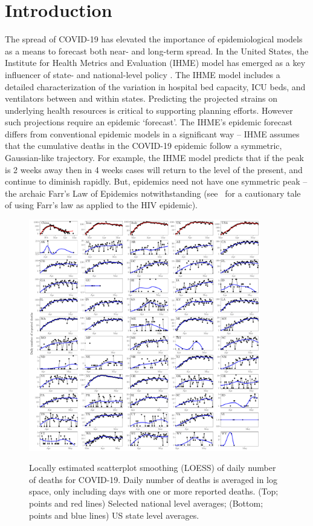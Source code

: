 \section{Introduction}
The spread of COVID-19 has elevated the importance of epidemiological
models as a means to forecast both near- and long-term spread. 
In the United States, the Institute for Health Metrics and Evaluation (IHME)
model has emerged as a key influencer of state- and national-level
policy \citep{covid2020forecasting}.  
The IHME model includes a detailed characterization
of the variation in
hospital bed capacity, ICU beds, and ventilators between and within
states. Predicting the projected strains on underlying
health resources is critical to supporting planning efforts.
However such projections require
an epidemic `forecast'.  The IHME's epidemic forecast
differs from conventional
epidemic models in a significant way -- IHME assumes
that the cumulative deaths in the COVID-19 epidemic 
follow a symmetric, Gaussian-like trajectory. 
For example, the 
IHME model predicts that if the peak is 2 weeks away then in 4 weeks
cases will return to the level of the present, and continue
to diminish rapidly.  But, epidemics need not have one symmetric peak -- 
the archaic Farr's Law of Epidemics notwithstanding
(see~\citep{bregman1990farr} for a cautionary tale of using
Farr's law as applied to the HIV epidemic). 
\begin{figure}[t!]
\begin{center}
\includegraphics[width=0.9\textwidth]{deaths/national_death.pdf}\\
\caption{Locally estimated scatterplot smoothing (LOESS) of daily number of deaths for COVID-19.
Daily number of deaths is averaged in log space, only including days with
one or more reported deaths. (Top; points and red lines) Selected national
level averages; (Bottom; points and blue lines) US state level averages.
\label{fig.plateaus_cases}}
\end{center}
\end{figure}

